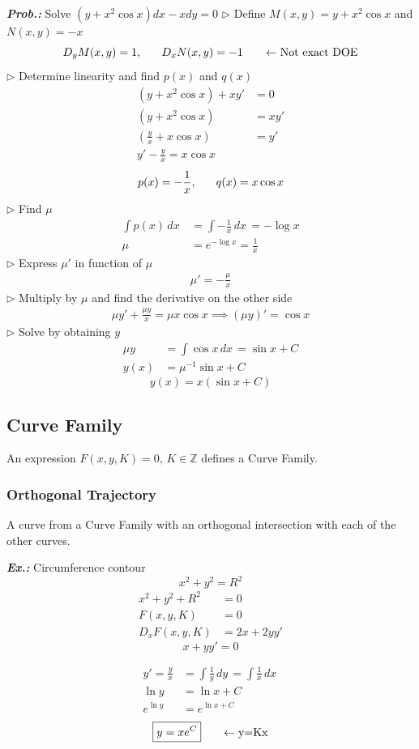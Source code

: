 \documentclass[a4paper]{article}
\begin{document}
\textbf{\textit{Prob.: }}Solve $(y+x^{2}\cos x)dx-xdy=0$ 
$\triangleright$ Define $M(x,y)=y+x^{2}\cos x$ and $N(x,y)=-x$
$$
D_{y}M(x,y)=1,\hspace{4ex}D_{x}N(x,y)=-1 \hspace{4ex}\leftarrow\text{Not exact DOE}
$$
$\triangleright$ Determine linearity and find $p(x)$ and $q(x)$
\begin{align}
(y+x^{2}\cos x)+xy'&=0 \\
(y+x^{2}\cos x)&=xy' \\
\left( \frac{y}{x}+x\cos x \right)&=y' \\
y'-\frac{y}{x}=x\cos x
\end{align}
$$
p(x)=-\frac{1}{x},\hspace{4ex}q(x)=x\cos x
$$
$\triangleright$ Find $\mu$
\begin{align}
\int p(x) \, dx\, &=\int -\frac{1}{x} \, dx\, =-\log x \\
\mu&=e^{ -\log x }=\frac{1}{x}
\end{align}
$\triangleright$ Express $\mu'$ in function of $\mu$
\begin{align}
\mu'=-\frac{\mu}{x}
\end{align}
$\triangleright$ Multiply by $\mu$ and find the derivative on the other side
\begin{align}
\mu y'+\frac{\mu y}{x}=\mu x\cos x \implies (\mu y)'=\cos x
\end{align}
$\triangleright$ Solve by obtaining $y$
\begin{align}
\mu y&=\int \cos x \, dx\, =\sin x+C  \\
y(x)&=\mu^{-1}\sin x+C
\end{align}
$$
\boxed{y(x)=x(\sin x+C)}
$$
\subsection{Curve Family}
An expression $F(x,y,K)=0,\,K\in\mathbb{Z}$ defines a Curve Family.

\subsubsection{Orthogonal Trajectory}
A curve from a Curve Family with an orthogonal intersection with each of the other curves.



\textbf{\textit{Ex.: }}Circumference contour
$$
x^{2}+y^{2}=R^{2}
$$
\begin{align}
x^{2}+y^{2}+R^{2}&=0 \\
F(x,y,K)&=0 \\
D_{x}F(x,y,K)&=2x+2yy'
\end{align}
$$
\boxed{x+yy'=0}
$$

\begin{align}
y'=\frac{y}{x}&=\int \frac{1}{y} \, dy\, =\int \frac{1}{x} \, dx\,  \\
\ln y&=\ln x+C \\
e^{ \ln y }&=e^{ \ln x+C }
\end{align}
$$
\boxed{y=xe^{ C }}\hspace{4ex}\leftarrow\text{y=Kx}
$$
\end{document}
